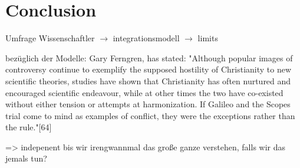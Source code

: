 \section{Conclusion}
\label{sec:Conclusion}

Umfrage Wissenschaftler \(\to\) integrationsmodell \(\to\) limits

bezüglich der Modelle:
Gary Ferngren, has stated: "Although popular images of controversy continue to exemplify the supposed hostility of Christianity to new scientific theories, studies have shown that Christianity has often nurtured and encouraged scientific endeavour, while at other times the two have co-existed without either tension or attempts at harmonization. If Galileo and the Scopes trial come to mind as examples of conflict, they were the exceptions rather than the rule."[64]

=> indepenent bis wir irengwannmal das große ganze verstehen, falls wir das jemals tun?

